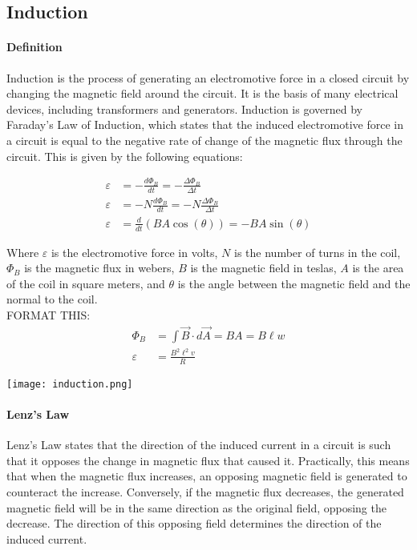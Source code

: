 \subsection{Induction}
\hrulefill

\paragraph*{Definition}
Induction is the process of generating an electromotive force in a closed circuit by changing the magnetic field around the circuit.
It is the basis of many electrical devices, including transformers and generators. Induction is governed by Faraday's Law of Induction,
which states that the induced electromotive force in a circuit is equal to the negative rate of change of the magnetic flux through 
the circuit. This is given by the following equations:

\begin{align*}
    \varepsilon &= -\frac{d\Phi_B}{dt} = -\frac{\Delta \Phi_B}{\Delta t}\\
    \varepsilon &= -N\frac{d\Phi_B}{dt} = -N\frac{\Delta \Phi_B}{\Delta t}\\
    \varepsilon &= \frac{d}{dt}(BA\cos(\theta)) = -BA\sin(\theta)
\end{align*}

Where $\varepsilon$ is the electromotive force in volts, $N$ is the number of turns in the coil, $\Phi_B$ is the magnetic flux in webers,
$B$ is the magnetic field in teslas, $A$ is the area of the coil in square meters, and $\theta$ is the angle between the magnetic field
and the normal to the coil.\\

FORMAT THIS: 
\begin{align*}
    \Phi_B &= \int \vec{B} \cdot d\vec{A} = BA = B\ell w\\
    \varepsilon &= \frac{B^2\ell^2v}{R}
\end{align*}

\begin{center}
    \texttt{[image: induction.png]}
\end{center}

\paragraph*{Lenz's Law}
Lenz's Law states that the direction of the induced current in a circuit is such that it opposes the change in magnetic flux that caused it. 
Practically, this means that when the magnetic flux increases, an opposing magnetic field is generated to counteract the increase. 
Conversely, if the magnetic flux decreases, the generated magnetic field will be in the same direction as the original field, opposing the 
decrease. The direction of this opposing field determines the direction of the induced current.

